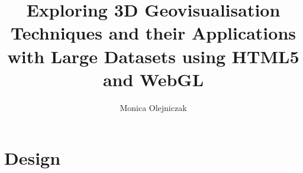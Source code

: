 \documentclass[
	paper=A4,
	titlepage=true,
	appendixprefix=true,
	headings=appendixwithoutprefixline,
	fontsize=11pt,
	parskip=half
]{scrreprt}
\title{Exploring 3D Geovisualisation Techniques and their Applications with Large Datasets using HTML5 and WebGL}
\author{Monica Olejniczak}
\begin{document}
	



	
	\chapter{Design} {
	\label{ch:design}
		
	}



	

\end{document}
